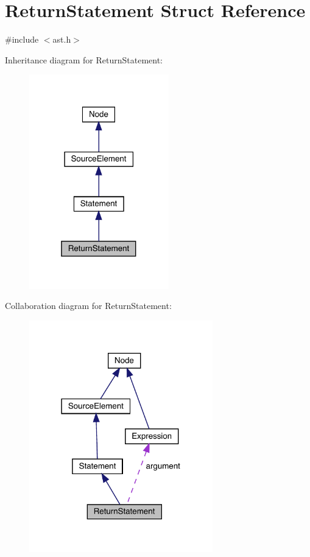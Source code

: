 \hypertarget{struct_return_statement}{}\section{Return\+Statement Struct Reference}
\label{struct_return_statement}


{\ttfamily \#include $<$ast.\+h$>$}



Inheritance diagram for Return\+Statement\+:\nopagebreak
\begin{figure}[H]
\begin{center}
\leavevmode
\includegraphics[width=172pt]{struct_return_statement__inherit__graph}
\end{center}
\end{figure}


Collaboration diagram for Return\+Statement\+:\nopagebreak
\begin{figure}[H]
\begin{center}
\leavevmode
\includegraphics[width=226pt]{struct_return_statement__coll__graph}
\end{center}
\end{figure}
